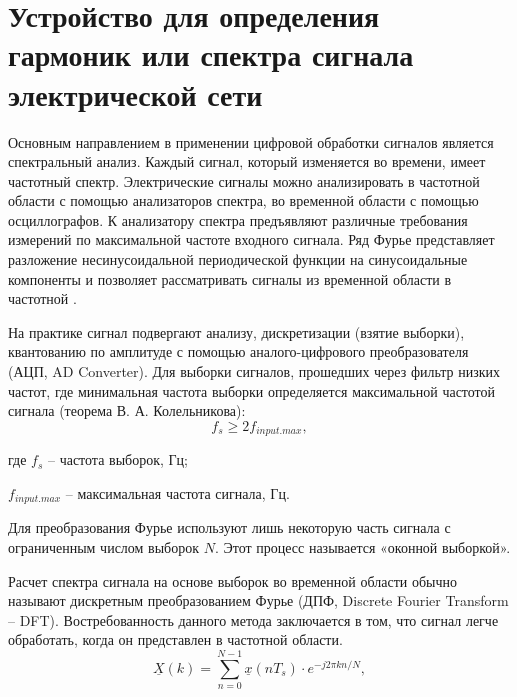 


\section{Устройство для определения гармоник или спектра сигнала электрической сети} \label{sec:ch3/sect12}

Основным направлением в применении цифровой обработки сигналов является спектральный анализ. Каждый сигнал, который изменяется во времени, имеет частотный спектр. Электрические сигналы можно 
анализировать в частотной области с помощью анализаторов спектра, во временной области с помощью осциллографов. К анализатору спектра предъявляют различные требования измерений по максимальной частоте входного сигнала. Ряд Фурье представляет разложение несинусоидальной периодической функции на синусоидальные компоненты и позволяет рассматривать сигналы из временной области в частотной \cite{information-measuring2018}.

На практике сигнал подвергают анализу, дискретизации (взятие выборки), квантованию по амплитуде с помощью аналого-цифрового преобразователя (АЦП, AD Converter). Для выборки сигналов, прошедших 
через фильтр низких частот, где минимальная частота выборки определяется максимальной частотой сигнала (теорема В. А. Колельникова): 
\begin{equation}
 \label{eq:equation3.9.1}
 f_s \geqslant 2f_{input.max},
\end{equation}

где $f_s$ – частота выборок, Гц;

$f_{input.max}$ – максимальная частота сигнала, Гц.

Для преобразования Фурье используют лишь некоторую часть сигнала с ограниченным числом выборок 
$N$. Этот процесс называется «оконной выборкой».

Расчет спектра сигнала на основе выборок во временной области обычно называют дискретным преобразованием Фурье (ДПФ, Discrete Fourier Transform – DFT). Востребованность данного метода заключается в том, что сигнал легче обработать, когда он представлен в частотной области.
\begin{equation}
\label{eq:equation3.9.2}
	\underline{X}(k) = \sum^{N-1}_{n=0} \underline{x}(nT_s) \cdot e^{-j2 \pi kn/N},
\end{equation}

